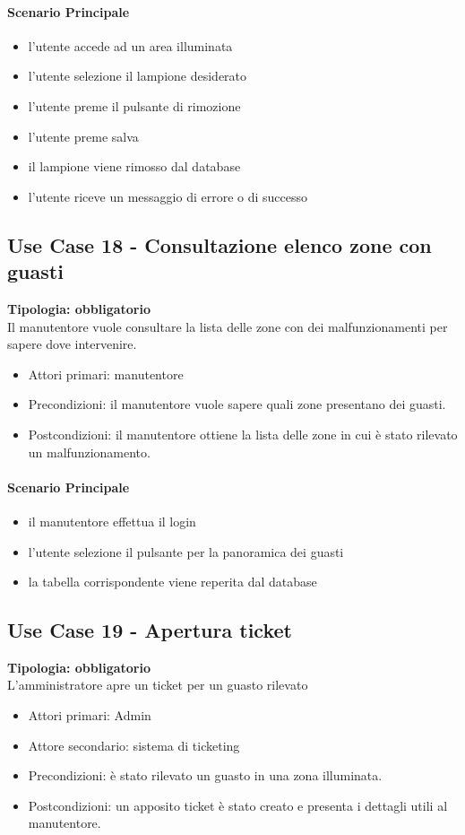 \documentclass[12pt]{article}
\begin{document}
\paragraph{Scenario Principale}
\begin{itemize}
	\item l'utente accede ad un area illuminata
	\item l'utente selezione il lampione desiderato
	\item l'utente preme il pulsante di rimozione
	\item l'utente preme salva
	\item il lampione viene rimosso dal database
	\item l'utente riceve un messaggio di errore o di successo
\end{itemize}


\subsection{Use Case 18 - Consultazione elenco zone con guasti}
\textbf{Tipologia: obbligatorio}\\
Il manutentore vuole consultare la lista delle zone con dei malfunzionamenti per sapere dove intervenire.
\begin{itemize}
	\item Attori primari: manutentore
	\item Precondizioni: il manutentore vuole sapere quali zone presentano dei guasti.\\
	\item Postcondizioni: il manutentore ottiene la lista delle zone in cui è stato rilevato un malfunzionamento.
\end{itemize}
\paragraph{Scenario Principale}
\begin{itemize}
	\item il manutentore effettua il login
	\item l'utente selezione il pulsante per la panoramica dei guasti
	\item la tabella corrispondente viene reperita dal database
\end{itemize}


\subsection{Use Case 19 - Apertura ticket}
\textbf{Tipologia: obbligatorio}\\
L'amministratore apre un ticket per un guasto rilevato
\begin{itemize}
	\item Attori primari: Admin
	\item Attore secondario: sistema di ticketing
	\item Precondizioni: è stato rilevato un guasto in una zona illuminata.
	\item Postcondizioni: un apposito ticket è stato creato e presenta i dettagli utili al manutentore.
\end{itemize}
\end{document}
